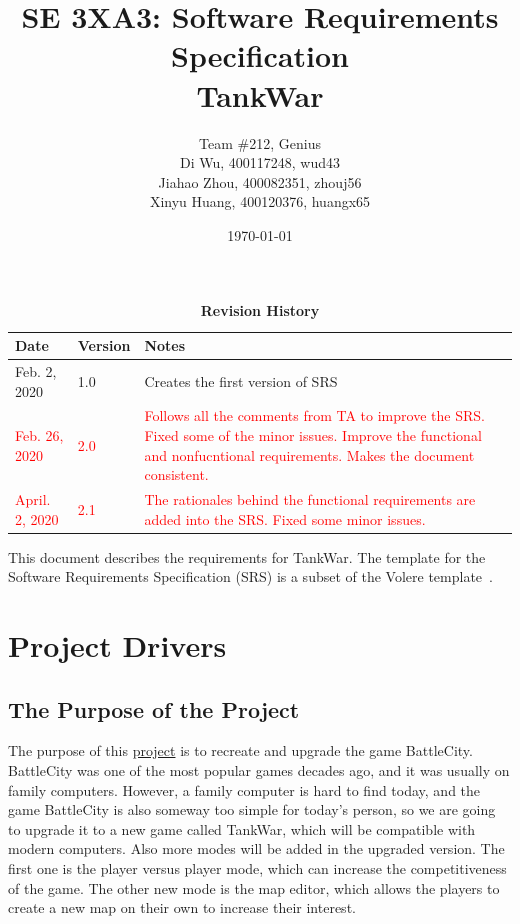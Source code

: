 \documentclass[12pt, titlepage]{article}
\title{SE 3XA3: Software Requirements Specification\\TankWar}
\author{Team \#212, Genius
		\\Di Wu, 400117248, wud43 
		\\Jiahao Zhou, 400082351, zhouj56 
		\\Xinyu Huang, 400120376, huangx65
}
\date{\today}
\begin{document}
\maketitle

\tableofcontents
\listoftables
\listoffigures

\begin{table}[bp]
\caption{\bf Revision History}
\begin{tabularx}{\textwidth}{p{3cm}p{2cm}X}
\toprule {\bf Date} & {\bf Version} & {\bf Notes}\\
\midrule
Feb. 2, 2020 & 1.0 & Creates the first version of SRS\\
\textcolor{red}{Feb. 26, 2020} & \textcolor{red}{2.0} & \textcolor{red}{Follows all the comments from TA to improve the SRS. Fixed some of the minor issues. Improve the functional and nonfucntional requirements. Makes the document consistent.}\\
\textcolor{red}{April. 2, 2020} & \textcolor{red}{2.1} & \textcolor{red}{The rationales behind the functional requirements are added into the SRS. Fixed some minor issues.}\\
\bottomrule
\end{tabularx}
\end{table}

\newpage


This document describes the requirements for TankWar. The template for the Software
Requirements Specification (SRS) is a subset of the Volere template~\citep{RobertsonAndRobertson2012}.  %

\section{Project Drivers}

\subsection{The Purpose of the Project}
The purpose of this \underline{project} is to recreate and upgrade the game BattleCity. BattleCity was one of the most popular games decades ago, and it was usually on family computers. However, a family computer is hard to find today, and the game BattleCity is also someway too simple for today’s person, so we are going to upgrade it to a new game called TankWar, which will be compatible with modern computers. Also more modes will be added in the upgraded version. The first one is the player versus player mode, which can increase the competitiveness of the game. The other new mode is the map editor, which allows the players to create a new map on their own to increase their interest.
\end{document}
